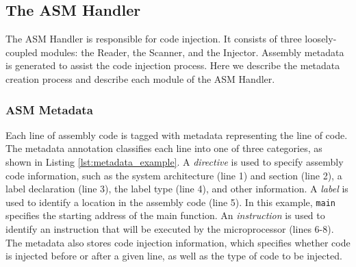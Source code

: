 \subsection{The ASM Handler}
\vspace{-5pt}

The ASM Handler is responsible for code injection. It consists of three loosely-coupled modules: the Reader, the Scanner, and the Injector. Assembly metadata is generated to assist the code injection process. Here we describe the metadata creation process and describe each module of the ASM Handler.
\vspace{-15pt}
\subsubsection{ASM Metadata}

Each line of assembly code is tagged with metadata representing the line of code. The metadata annotation classifies each line into one of three categories, as shown in Listing \ref{lst:metadata_example}. A \textit{directive} is used to specify assembly code information, such as the system architecture (line 1) and section (line 2), a label declaration (line 3), the label type (line 4), and other information. A \textit{label} is used to identify a location in the assembly code (line 5). In this example, \texttt{main} specifies the starting address of the main function. An \textit{instruction} is used to identify an instruction that will be executed by the microprocessor (lines 6-8). The metadata also stores code injection information, which specifies whether code is injected before or after a given line, as well as the type of code to be injected.
\vspace{-15pt}
